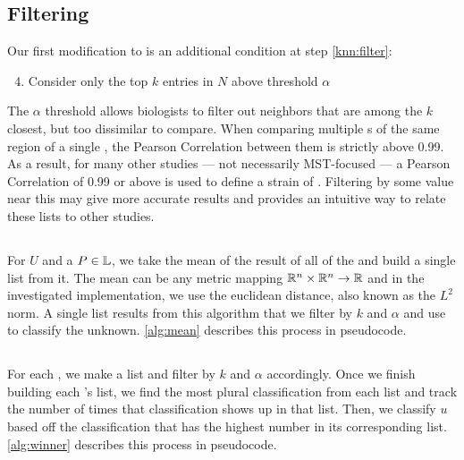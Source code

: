 

\subsection{\a{} Filtering}
Our first modification to \kNN{} is an additional condition at step \ref{knn:filter}:
\begin{enumerate}
\setcounter{enumi}{3}
\item Consider only the top $k$ entries in $N$ above threshold $\alpha$
\end{enumerate}

The $\alpha$ threshold allows biologists to filter out neighbors that are among the $k$ closest, but too dissimilar to compare. 
When comparing multiple \pyro{}s of the same region of a single \isol{}, the Pearson Correlation between them is strictly above 0.99.
As a result, for many other studies --- not necessarily MST-focused --- a Pearson Correlation of 0.99 or above is used to define a strain of \ecoli{}. 
Filtering by some value near this may give more accurate results and provides an intuitive way to relate these lists to other studies.


\subsection{\rmean{}}
For $U$ and a $P\in\mathbb{L}{}$, we take the mean of the result of all of the \compfuncs{} and build a single \knnlong{} list from it.
The mean can be any metric mapping $\mathbb{R}^n\times\mathbb{R}^n\rightarrow\mathbb{R}$ and in the investigated implementation, we use the euclidean distance, also known as the $L^2$ norm.
A single \knnlong{} list results from this algorithm that we filter by $k$ and $\alpha$ and use to classify the unknown.
\autoref{alg:mean} describes this process in pseudocode.


\subsection{\rwinner{}}
For each \compfunc{}, we make a \knnlong{} list and filter by $k$ and $\alpha$ accordingly.
Once we finish building each \compfunc{}'s \knn{} list, we find the most plural classification from each list and track the number of times that classification shows up in that list.
Then, we classify $u$ based off the classification that has the highest number in its corresponding list.
\autoref{alg:winner} describes this process in pseudocode.


